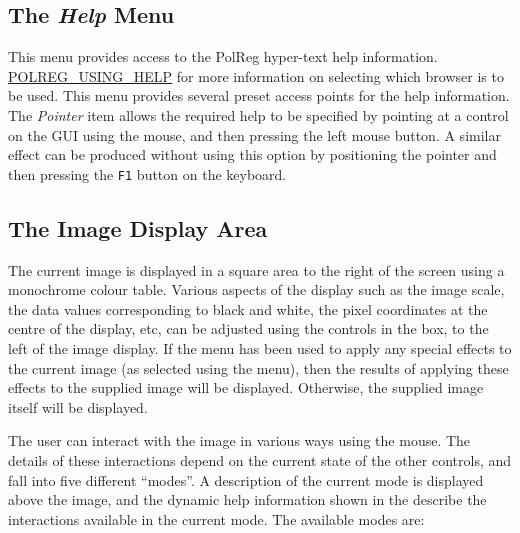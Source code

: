 \subsection {The {\em Help} Menu}
This menu provides access to the PolReg hyper-text help information. 
\hyperref{Go here}{See section }{}{POLREG_USING_HELP} for more information
on selecting which browser is to be used. This menu provides several preset
access points for the help information. The {\em Pointer} item allows the 
required help to be specified by pointing at a control on the GUI using the 
mouse, and then pressing the left mouse button. A similar effect can be
produced without using this option by positioning the pointer and then
pressing the {\tt F1} button on the keyboard.

\subsection {The Image Display Area}
The current image is displayed in a square area to the right of the
screen using a monochrome colour table. Various aspects of the display
such as the image scale, the data values corresponding to black and
white, the pixel coordinates at the centre of the display, etc, can be
adjusted using the controls in the  box, to the left of the image
display. If the  menu has
been used to apply any special effects to the current image (as selected
using the  menu), then the
results of applying these effects to the supplied image will be
displayed. Otherwise, the supplied image itself will be displayed.

The user can interact with the image in various ways using the mouse. The
details of these interactions depend on the current state of the other
controls, and fall into five different ``modes''. A description of the
current mode is displayed above the image, and the dynamic help
information shown in the 
describe the interactions available in the current mode. The available
modes are:

